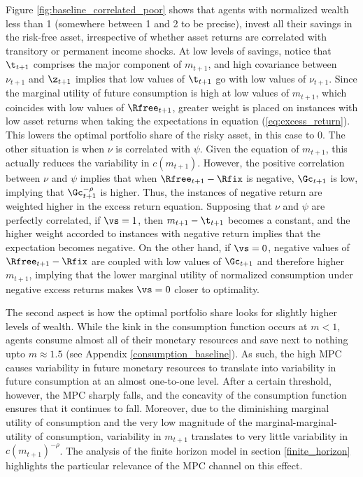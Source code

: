 Figure \ref{fig:baseline_correlated_poor} shows that agents with normalized wealth less than 1 (somewhere between 1 and 2 to be precise), invest all their savings in the risk-free asset, irrespective of whether asset returns are correlated with transitory or permanent income shocks. At low levels of savings, notice that $\t_{t+1}$ comprises the major component of $m_{t+1}$, and high covariance between $\nu_{t+1}$ and $\z_{t+1}$ implies that low values of $\t_{t+1}$ go with low values of $\nu_{t+1}$. Since the marginal utility of future consumption is high at low values of $m_{t+1}$, which coincides with low values of $\Rfree_{t+1}$, greater weight is placed on instances with low asset returns when taking the expectations in equation (\ref{eq:excess_return}). This lowers the optimal portfolio share of the risky asset, in this case to 0. The other situation is when $\nu$ is correlated with $\psi$. Given the equation of $m_{t+1}$, this actually reduces the variability in $c(m_{t+1})$. However, the positive correlation between $\nu$ and $\psi$ implies that when $\Rfree_{t+1} - \Rfix$ is negative, $\Gc_{t+1}$ is low, implying that $\Gc_{t+1}^{-\rho}$ is higher. Thus, the instances of negative return are weighted higher in the excess return equation. Supposing that $\nu$ and $\psi$ are perfectly correlated, if $\vs = 1$, then $m_{t+1} - \t_{t+1}$ becomes a constant, and the higher weight accorded to instances with negative return implies that the expectation becomes negative. On the other hand, if $\vs = 0$, negative values of $\Rfree_{t+1} - \Rfix$ are coupled with low values of $\Gc_{t+1}$ and therefore higher $m_{t+1}$, implying that the lower marginal utility of normalized consumption under negative excess returns makes $\vs = 0$ closer to optimality.

The second aspect is how the optimal portfolio share looks for slightly higher levels of wealth. While the kink in the consumption function occurs at $m < 1$, agents consume almost all of their monetary resources and save next to nothing upto $m \approx 1.5$ (see Appendix \ref{consumption_baseline}). As such, the high MPC causes variability in future monetary resources to translate into variability in future consumption at an almost one-to-one level. After a certain threshold, however, the MPC sharply falls, and the concavity of the consumption function ensures that it continues to fall. Moreover, due to the diminishing marginal utility of consumption and the very low magnitude of the marginal-marginal-utility of consumption, variability in $m_{t+1}$ translates to very little variability in $c(m_{t+1})^{-\rho}$. The analysis of the finite horizon model in section \ref{finite_horizon} highlights the particular relevance of the MPC channel on this effect.

